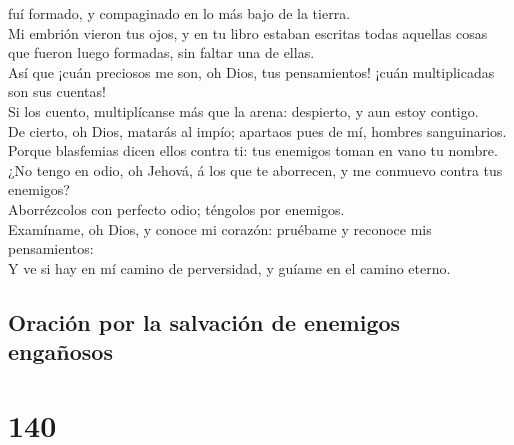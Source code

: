 fuí formado, y compaginado en lo más bajo de la tierra.\\
 Mi embrión vieron tus ojos, y en tu libro estaban
escritas todas aquellas cosas que fueron luego formadas, sin faltar una
de ellas.\\
 Así que ¡cuán preciosos me son, oh Dios, tus
pensamientos! ¡cuán multiplicadas son sus cuentas!\\
 Si los cuento, multiplícanse más que la arena:
despierto, y aun estoy contigo.\\
 De cierto, oh Dios, matarás al impío; apartaos pues de
mí, hombres sanguinarios.\\
 Porque blasfemias dicen ellos contra ti: tus enemigos
toman en vano tu nombre.\\
 ¿No tengo en odio, oh Jehová, á los que te aborrecen, y
me conmuevo contra tus enemigos?\\
 Aborrézcolos con perfecto odio; téngolos por enemigos.\\
 Examíname, oh Dios, y conoce mi corazón: pruébame y
reconoce mis pensamientos:\\
 Y ve si hay en mí camino de perversidad, y guíame en el
camino eterno.

\hypertarget{oraciuxf3n-por-la-salvaciuxf3n-de-enemigos-engauxf1osos}{%
\subsection{Oración por la salvación de enemigos
engañosos}\label{oraciuxf3n-por-la-salvaciuxf3n-de-enemigos-engauxf1osos}}

\hypertarget{section-19-140}{%
\section{140}\label{section-19-140}}

